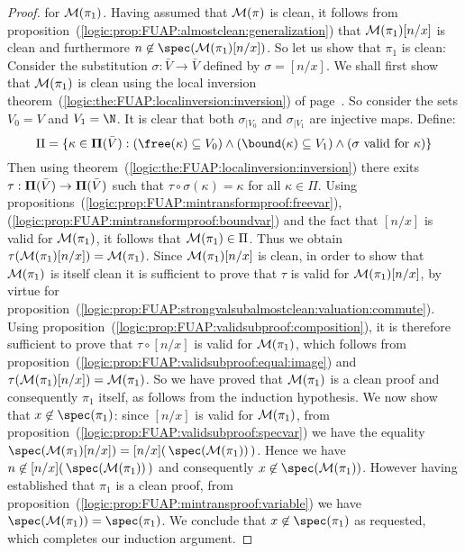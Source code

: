 \begin{proof}
for ${\cal M}(\pi_{1})$. Having assumed that ${\cal M}(\pi)$ is
clean, it follows from
proposition~(\ref{logic:prop:FUAP:almostclean:generalization}) that
${\cal M}(\pi_{1})[n/x]$ is clean and furthermore
$n\not\in\spec({\cal M}(\pi_{1})[n/x])$. So let us show that
$\pi_{1}$ is clean: Consider the substitution
$\sigma:\bar{V}\to\bar{V}$ defined by $\sigma=[n/x]$. We shall first
show that ${\cal M}(\pi_{1})$ is clean using the local inversion
theorem~(\ref{logic:the:FUAP:localinversion:inversion}) of
page~\pageref{logic:the:FUAP:localinversion:inversion}. So consider
the sets $V_{0}=V$ and $V_{1}=\N$. It is clear that both
$\sigma_{|V_{0}}$ and $\sigma_{|V_{1}}$ are injective maps. Define:
    \[
    \Pi=\{\kappa\in{\bf\Pi}(\bar{V}):(\free(\kappa)\subseteq
    V_{0})\land(\bound(\kappa)\subseteq V_{1})\land(\mbox{$\sigma$
    valid for $\kappa$})\}
    \]
Then using theorem~(\ref{logic:the:FUAP:localinversion:inversion})
there exits $\tau:{\bf\Pi}(\bar{V})\to{\bf\Pi}(\bar{V})$ such that
$\tau\circ\sigma(\kappa)=\kappa$ for all $\kappa\in\Pi$. Using
propositions~(\ref{logic:prop:FUAP:mintransformproof:freevar}),
(\ref{logic:prop:FUAP:mintransformproof:boundvar}) and the fact that
$[n/x]$ is valid for ${\cal M}(\pi_{1})$, it follows that ${\cal
M}(\pi_{1})\in\Pi$. Thus we obtain $\tau({\cal
M}(\pi_{1})[n/x])={\cal M}(\pi_{1})$. Since ${\cal M}(\pi_{1})[n/x]$
is clean, in order to show that ${\cal M}(\pi_{1})$ is itself clean
it is sufficient to prove that $\tau$ is valid for ${\cal
M}(\pi_{1})[n/x]$, by virtue for
proposition~(\ref{logic:prop:FUAP:strongvalsubalmostclean:valuation:commute}).
Using proposition~(\ref{logic:prop:FUAP:validsubproof:composition}),
it is therefore sufficient to prove that $\tau\circ[n/x]$ is valid
for ${\cal M}(\pi_{1})$, which follows from
proposition~(\ref{logic:prop:FUAP:validsubproof:equal:image}) and
$\tau({\cal M}(\pi_{1})[n/x])={\cal M}(\pi_{1})$. So we have proved
that ${\cal M}(\pi_{1})$ is a clean proof and consequently $\pi_{1}$
itself, as follows from the induction hypothesis. We now show that
$x\not\in\spec(\pi_{1})$: since $[n/x]$ is valid for ${\cal
M}(\pi_{1})$, from
proposition~(\ref{logic:prop:FUAP:validsubproof:specvar}) we have
the equality $\spec({\cal M}(\pi_{1})[n/x])=[n/x](\,\spec({\cal
M}(\pi_{1}))\,)$. Hence we have $n\not\in[n/x](\,\spec({\cal
M}(\pi_{1}))\,)$ and consequently $x\not\in\spec({\cal
M}(\pi_{1}))$. However having established that $\pi_{1}$ is a clean
proof, from
proposition~(\ref{logic:prop:FUAP:mintransproof:variable}) we have
$\spec({\cal M}(\pi_{1}))=\spec(\pi_{1})$. We conclude that
$x\not\in\spec(\pi_{1})$ as requested, which completes our induction
argument.
\end{proof}
